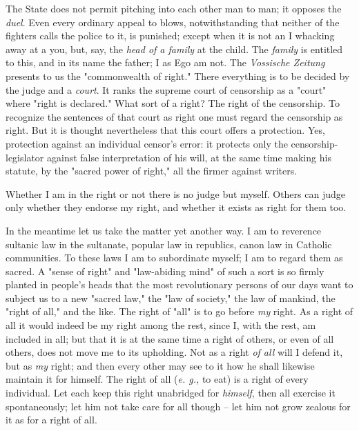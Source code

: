 \documentclass[a4paper]{book}
\begin{document}
The State does not permit pitching into each other man to man; it opposes the 
\textit{duel}. Even every ordinary appeal to blows, notwithstanding that 
neither of the fighters calls the police to it, is punished; except when it is 
not an I whacking away at a you, but, say, the \textit{head of a family} at 
the child. The \textit{family} is entitled to this, and in its name the 
father; I as Ego am not. The \textit{Vossische Zeitung} presents to us the 
"{}commonwealth of right."{} There everything is to be decided by the judge 
and a \textit{court}. It ranks the supreme court of censorship as a 
"{}court"{} where "{}right is declared."{} What sort of a right? The right of 
the censorship. To recognize the sentences of that court as right one must 
regard the censorship as right. But it is thought nevertheless that this court 
offers a protection. Yes, protection against an individual censor's error: it 
protects only the censorship-legislator against false interpretation of his 
will, at the same time making his statute, by the "{}sacred power of right,"{} 
all the firmer against writers.

Whether I am in the right or not there is no judge but myself. Others can 
judge only whether they endorse my right, and whether it exists as right for 
them too.

In the meantime let us take the matter yet another way. I am to reverence 
sultanic law in the sultanate, popular law in republics, canon law in Catholic 
communities. To these laws I am to subordinate myself; I am to regard them as 
sacred. A "{}sense of right"{} and "{}law-abiding mind"{} of such a sort is so 
firmly planted in people's heads that the most revolutionary persons of our 
days want to subject us to a new "{}sacred law,"{} the "{}law of society,"{} 
the law of mankind, the "{}right of all,"{} and the like. The right of 
"{}all"{} is to go before \textit{my} right. As a right of all it would indeed 
be my right among the rest, since I, with the rest, am included in all; but 
that it is at the same time a right of others, or even of all others, does not 
move me to its upholding. Not as a right \textit{of all} will I defend it, but 
as \textit{my} right; and then every other may see to it how he shall likewise 
maintain it for himself. The right of all (\textit{e. g.,} to eat) is a right 
of every individual. Let each keep this right unabridged for \textit{himself}, 
then all exercise it spontaneously; let him not take care for all though -- 
let him not grow zealous for it as for a right of all.
\end{document}
